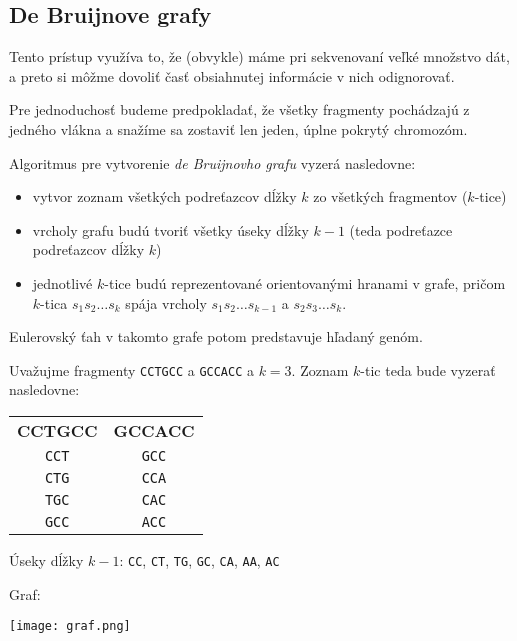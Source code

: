     \subsection{De Bruijnove grafy}
    Tento prístup využíva to, že (obvykle) máme pri sekvenovaní veľké množstvo
    dát, a preto si môžme dovoliť časť obsiahnutej informácie v nich
    odignorovať.
    
    Pre jednoduchosť budeme predpokladať, že všetky fragmenty pochádzajú z
    jedného vlákna a snažíme sa zostaviť len jeden, úplne pokrytý chromozóm.

    Algoritmus pre vytvorenie \emph{de Bruijnovho grafu} vyzerá nasledovne:
    
    \begin{itemize}
        \item vytvor zoznam všetkých podreťazcov dĺžky $k$ zo všetkých
        fragmentov ($k$-tice)
        \item vrcholy grafu budú tvoriť všetky úseky dĺžky $k - 1$ (teda
        podreťazce podreťazcov dĺžky $k$)
        \item jednotlivé $k$-tice budú reprezentované orientovanými hranami v
        grafe, pričom $k$-tica $s_1 s_2 \ldots s_k$ spája vrcholy $s_1 s_2
        \ldots s_{k-1}$ a $s_2 s_3 \ldots s_k$. 
    \end{itemize}
    
    Eulerovský ťah v takomto grafe potom predstavuje hľadaný genóm.
    
    \begin{example}
        Uvažujme fragmenty \texttt{CCTGCC} a \texttt{GCCACC} a $k = 3$. Zoznam
        $k$-tic teda bude vyzerať nasledovne:
        
        \bigskip
        
        \begin{tabular}{ c c }
            \textbf{CCTGCC} & \textbf{GCCACC} \\  
            \texttt{CCT}    & \texttt{GCC}    \\
            \texttt{CTG}    & \texttt{CCA}    \\
            \texttt{TGC}    & \texttt{CAC}    \\
            \texttt{GCC}    & \texttt{ACC}    \\
        \end{tabular}  
        
        \bigskip
        
        Úseky dĺžky $k-1$: \texttt{CC}, \texttt{CT}, \texttt{TG}, \texttt{GC},
        \texttt{CA}, \texttt{AA}, \texttt{AC}
        
        \bigskip
        
        Graf: 
        
        \texttt{[image: graf.png]}
    \end{example}